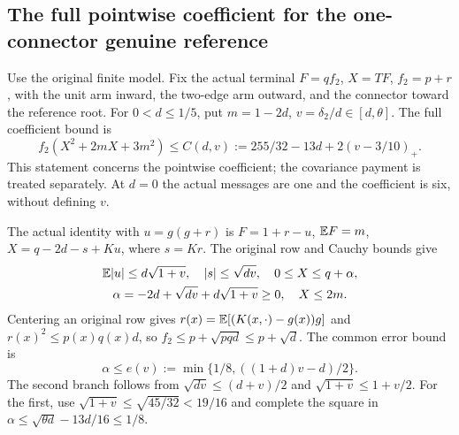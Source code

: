 \subsection{The full pointwise coefficient for the one-connector genuine reference}\label{proof:Q5-C029}
Use the original finite model. Fix the
actual terminal $F=qf_2$, $X=TF$, $f_2=p+r$, with the unit arm inward,
the two-edge arm outward, and the connector toward the reference root.
For $0<d\le1/5$, put $m=1-2d$, $v=\delta_2/d\in[d,\theta]$.
The full coefficient bound is
\begin{equation}\tag{L29.T}\label{eq:L29:claim}
f_2(X^2+2mX+3m^2)\le C(d,v):=255/32-13d+2(v-3/10)_+.
\end{equation}
This statement concerns the pointwise coefficient; the covariance payment is treated separately. At $d=0$ the actual
messages are one and the coefficient is six, without defining $v$.

The actual identity with $u=g(g+r)$ is
$F=1+r-u$, $\mathbb E F=m$, $X=q-2d-s+Ku$, where $s=Kr$.
The original row and Cauchy bounds give
\[
\begin{gathered}
\mathbb E|u|\le d\sqrt{1+v},\quad |s|\le\sqrt{dv},\quad 0\le X\le q+\alpha,\\
\alpha=-2d+\sqrt{dv}+d\sqrt{1+v}\ge0,\quad X\le2m.
\end{gathered}
\]
Centering an original row gives $r(x)=\mathbb E[(K(x,\cdot)-g(x))g]$ and
$r(x)^2\le p(x)q(x)d$, so $f_2\le p+\sqrt{pqd}\le p+\sqrt d$.
The common error bound is
\begin{equation}\tag{L29.e}\label{eq:L29:error}
\alpha\le e(v):=\min\{1/8,((1+d)v-d)/2\}.
\end{equation}
The second branch follows from $\sqrt{dv}\le(d+v)/2$ and
$\sqrt{1+v}\le1+v/2$. For the first, use
$\sqrt{1+v}\le\sqrt{45/32}<19/16$ and complete the square in
$\alpha\le\sqrt{\theta d}-13d/16\le1/8$.

